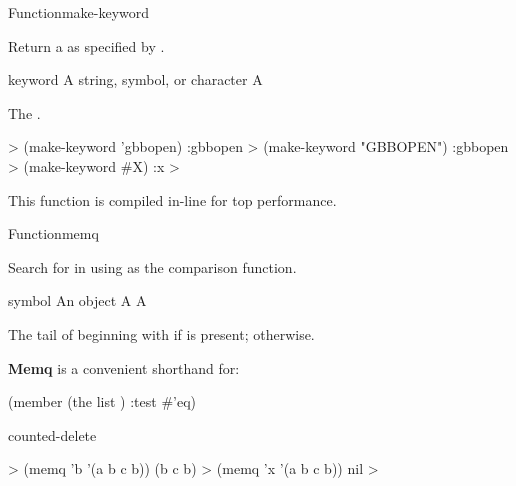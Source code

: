 \documentclass[10pt,twoside,english,pdftex]{article}
\newcommand{\inline}{This function is compiled in-line for top performance.}
\begin{document}

\begin{functiondoc}{Function}{make-keyword}{
    }
%
%
  
\fnsyntax

\fnpurpose Return a  as specified by .

\fnpackage {}

\fnmodule {}

\fnargs
\begin{args}{keyword}
\arg[x] A string, symbol, or character
\arg[keyword] A 
\end{args}

\fnreturns The .

\fnexamples
%
\W\supp
\begin{example}
  > (make-keyword 'gbbopen)
  :gbbopen
  > (make-keyword "GBBOPEN")
  :gbbopen
  > (make-keyword #\bkslash{}X)
  :x
  >
\end{example}

\fnnote \inline

\end{functiondoc}


\begin{functiondoc}{Function}{memq}{
    }
%
  
\fnsyntax

\fnpurpose Search for  in  using  as the
comparison function.

\fnpackage {}

\fnmodule {}

\fnargs
\begin{args}{symbol}
\arg[item] An object
\arg[list] A 
\arg[tail] A 
\end{args}

\fnreturns The tail of  beginning with  if
 is present; \nil{} otherwise.

\fndescription \textbf{Memq} is a convenient shorthand for:
%
\W\supp
\begin{example}
  (member  (the list ) :test #'eq)
\end{example}

\begin{alsos}{counted-delete}
\also[assq]
\also[delq]
\end{alsos}

\fnexamples
%
\W\supp
\begin{example}
  > (memq 'b '(a b c b))
  (b c b)
  > (memq 'x '(a b c b))
  nil
  >
\end{example}

\end{functiondoc}
\end{document}
